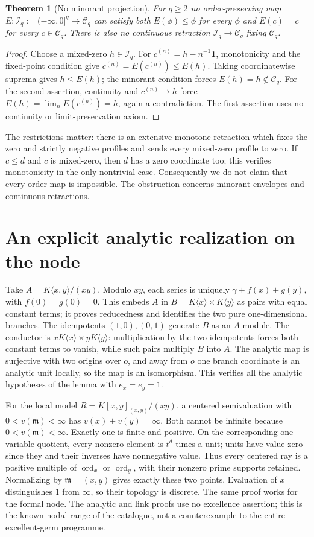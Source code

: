 \documentclass[11pt]{article}
\newtheorem{theorem}{Theorem}
\theoremstyle{definition}
\newcommand{\Cq}{\mathcal C_q}
\newcommand{\Iq}{\mathcal I_q}
\newcommand{\ord}{\operatorname{ord}}
\begin{document}
\begin{theorem}[No minorant projection]\label{thm:projection}
For $q\geq2$ no order-preserving map
$E:\Iq:=(-\infty,0]^q\to\Cq$ can satisfy both $E(\phi)\leq\phi$
for every $\phi$ and $E(c)=c$ for every $c\in\Cq$.
There is also no continuous retraction $\Iq\to\Cq$ fixing $\Cq$.
\end{theorem}
\begin{proof}
Choose a mixed-zero $h\in\Iq$. For $c^{(n)}=h-n^{-1}\mathbf1$,
monotonicity and the fixed-point condition give
$c^{(n)}=E(c^{(n)})\leq E(h)$. Taking coordinatewise suprema gives
$h\leq E(h)$; the minorant condition forces $E(h)=h\notin\Cq$.
For the second assertion, continuity and $c^{(n)}\to h$ force
$E(h)=\lim_n E(c^{(n)})=h$, again a contradiction. The first assertion
uses no continuity or limit-preservation axiom.
\end{proof}

The restrictions matter: there is an extensive monotone retraction
which fixes the zero and strictly negative profiles and sends every
mixed-zero profile to zero. If $c\leq d$ and $c$ is mixed-zero, then
$d$ has a zero coordinate too; this verifies monotonicity in the only
nontrivial case. Consequently we do not claim that every order map is
impossible. The obstruction concerns minorant envelopes and continuous
retractions.

\section{An explicit analytic realization on the node}
Take $A=K\langle x,y\rangle/(xy)$. Modulo $xy$, each series is uniquely
$\gamma+f(x)+g(y)$, with $f(0)=g(0)=0$. This embeds $A$ in
$B=K\langle x\rangle\times K\langle y\rangle$ as pairs with equal
constant terms; it proves reducedness and identifies the two pure
one-dimensional branches. The idempotents $(1,0),(0,1)$ generate $B$
as an $A$-module. The conductor is
$xK\langle x\rangle\times yK\langle y\rangle$: multiplication by
the two idempotents forces both constant terms to vanish, while such
pairs multiply $B$ into $A$. The analytic map is surjective with two
origins over $o$, and away from $o$ one branch coordinate is an analytic
unit locally, so the map is an isomorphism. This verifies all the analytic
hypotheses of the lemma with $e_x=e_y=1$.

For the local model $R=K[x,y]_{(x,y)}/(xy)$, a centered semivaluation with $0<v(\mathfrak m)<\infty$
has $v(x)+v(y)=\infty$. Both cannot be infinite because
$0<v(\mathfrak m)<\infty$. Exactly one is finite and positive. On the
corresponding one-variable quotient, every nonzero element is $t^d$
times a unit; units have value zero since they and their inverses have
nonnegative value. Thus every centered ray is a positive multiple of
$\ord_x$ or $\ord_y$, with their nonzero prime supports retained.
Normalizing by $\mathfrak m=(x,y)$ gives exactly these two points.
Evaluation of $x$ distinguishes $1$ from $\infty$, so their topology is
discrete. The same proof works for the formal node. The analytic and
link proofs use no excellence assertion; this is the known nodal range
of the catalogue, not a counterexample to the entire excellent-germ
programme.
\end{document}
